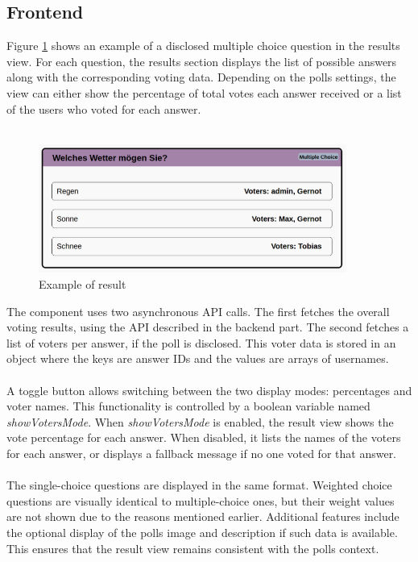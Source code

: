 \documentclass[a4paper,12pt]{report}
\begin{document}
\subsection{Frontend}
Figure \ref{fig:result} shows an example of a disclosed multiple choice question in the results view. For each question, the results section displays the list of possible answers along with the corresponding voting data. Depending on the polls settings, the view can either show the percentage of total votes each answer received or a list of the users who voted for each answer.\\ \\
\begin{figure}[H] 
	\centering 
	\includegraphics[width=0.9\textwidth]{pics/Results_example.png} 
	\caption{Example of result} 
	\label{fig:result} 
\end{figure}
\noindent
The component uses two asynchronous API calls. The first fetches the overall voting results, using the API described in the backend part. The second fetches a list of voters per answer, if the poll is disclosed. This voter data is stored in an object where the keys are answer IDs and the values are arrays of usernames. \\ \\
A toggle button allows switching between the two display modes: percentages and voter names. This functionality is controlled by a boolean variable named \textit{showVotersMode}. When \textit{showVotersMode} is enabled, the result view shows the vote percentage for each answer. When disabled, it lists the names of the voters for each answer, or displays a fallback message if no one voted for that answer. \\ \\
The single-choice questions are displayed in the same format. Weighted choice questions are visually identical to multiple-choice ones, but their weight values are not shown due to the reasons mentioned earlier. Additional features include the optional display of the polls image and description if such data is available. This ensures that the result view remains consistent with the polls context. \\
\end{document}
